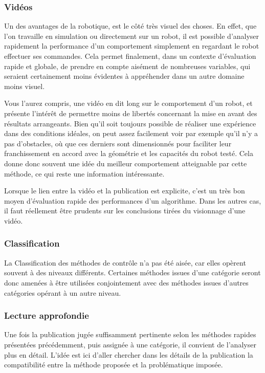 \documentclass{tnreport}
\begin{document}
\subsubsection{Vidéos}
Un des avantages de la robotique, est le côté très visuel des choses. En effet, que l'on travaille en simulation ou directement sur un robot, il est possible d'analyser rapidement la performance d'un comportement simplement en regardant le robot effectuer ses commandes. Cela permet finalement, dans un contexte d'évaluation rapide et globale, de prendre en compte aisément de nombreuses variables, qui seraient certainement moins évidentes à appréhender dans un autre domaine moins visuel.

Vous l'aurez compris, une vidéo en dit long sur le comportement d'un robot, et présente l'intérêt de permettre moins de libertés concernant la mise en avant des résultats arrangeants. Bien qu’il soit toujours possible de réaliser une expérience dans des conditions idéales, on peut assez facilement voir par exemple qu'il n'y a pas d'obstacles, où que ces derniers sont dimensionnés pour faciliter leur franchissement en accord avec la géométrie et les capacités du robot testé. Cela donne donc souvent une idée du meilleur comportement atteignable par cette méthode, ce qui reste une information intéressante. 

Lorsque le lien entre la vidéo et la publication est explicite, c'est un très bon moyen d'évaluation rapide des performances d'un algorithme. Dans les autres cas, il faut réellement être prudents sur les conclusions tirées du visionnage d'une vidéo. 

\subsubsection{Classification} \label{lb:classification}
La Classification des méthodes de contrôle n'a pas été aisée, car elles opèrent souvent à des niveaux différents. Certaines méthodes issues d'une catégorie seront donc amenées à être utilisées conjointement avec des méthodes issues d'autres catégories opérant à un autre niveau. 

\subsubsection{Lecture approfondie}
Une fois la publication jugée suffisamment pertinente selon les méthodes rapides présentées précédemment, puis assignée à une catégorie, il convient de l'analyser plus en détail. L'idée est ici d'aller chercher dans les détails de la publication la compatibilité entre la méthode proposée et la problématique imposée. 
\end{document}
